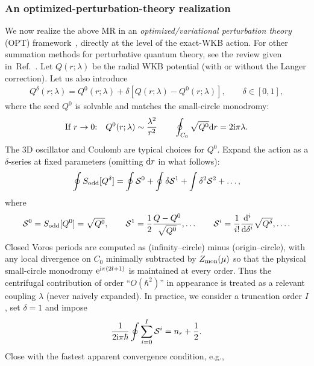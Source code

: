 \subsubsection{An optimized-perturbation-theory realization}
\label{src:2510_11766:sec:omp}
We now realize the above MR in an \textit{optimized/variational perturbation theory} (OPT) framework~\cite{Stevenson:1981vj,Duncan:1992ba,Buckley:1992pc,Kleinert:1995hc}, directly at the level of the exact-WKB action. For other summation methods for perturbative quantum theory, see the review given in~Ref.~\cite{Zinn-Justin:2010zzb}.
Let $Q(r;\lambda)$ be the radial WKB potential (with or without the Langer correction).
Let us also introduce
\begin{align}
    Q^\delta(r;\lambda) = Q^0(r;\lambda)+\delta\left[Q(r;\lambda)-Q^0(r;\lambda)\right],
    \qquad \delta\in[0,1],
\end{align}
where the seed $Q^0$ is solvable and matches the small-circle monodromy:
\begin{align}
    \text{If $r\to0$:}\quad
    Q^0(r;\lambda)\sim \frac{\lambda^2}{r^2}\qquad
    \oint_{C_0}\sqrt{Q^0} \mathrm{d} r=2\mathrm{i} \pi\lambda.
\end{align}
The $3$D oscillator and Coulomb are typical choices for $Q^0$.
Expand the action as a $\delta$-series at fixed parameters (omitting $\mathrm{d} r$ in what follows):
\begin{align}
\oint S_{\mathrm{odd}}[Q^\delta]
=\oint \mathcal{S}^0 +\oint \delta \mathcal{S}^1+\int \delta^2 \mathcal{S}^2+\dots,
\end{align}
where
\begin{align}
    \mathcal{S}^0 = S_{\mathrm{odd}}[Q^0] = \sqrt{Q^0}, \qquad
    \mathcal{S}^1 = \frac{1}{2}\frac{Q-Q^0}{\sqrt{Q^0}},\dots\qquad
    \mathcal{S}^i = \frac{1}{i!}\frac{\mathrm{d}^i}{\mathrm{d} \delta^i}\sqrt{Q^\delta}, \dots .
\end{align}
Closed Voros periods are computed as (infinity–circle) minus (origin–circle), with any local divergence on $C_0$ minimally subtracted by $Z_{\mathrm{mon}}(\mu)$ so that the physical small-circle monodromy $\mathrm{e}^{\mathrm{i} \pi(2l+1)}$ is maintained at every order.
Thus the centrifugal contribution of order ``$O(\hbar^2)$'' in appearance is treated as a
relevant coupling $\lambda$ (never naively expanded).
In practice, we consider a truncation order $I$, set $\delta=1$ and impose
\begin{align}
    \frac{1}{2\mathrm{i} \pi\hbar}\oint\sum_{i=0}^{I}\mathcal{S}^i
    =n_r+\frac{1}{2} .
\end{align}
Close with the fastest apparent convergence condition, e.g.,
